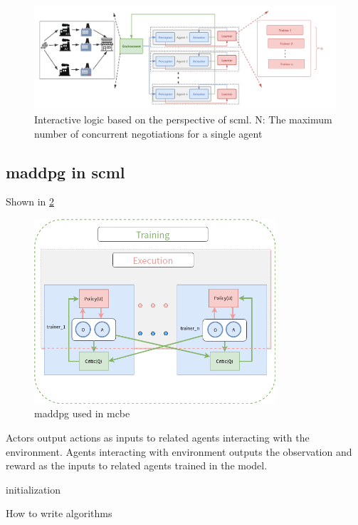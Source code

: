 \begin{figure}[htbp]
\centering
\includegraphics[width=1.0\textwidth]{./images/scnk.png}
\caption{Interactive logic based on the perspective of \gls{scml}. N: The maximum number of concurrent negotiations for a single agent}
\label{fig:interacting-logic-maddpg-scml}
\end{figure}
\subsection{\gls{maddpg} in \gls{scml}} \label{methods:maddpg}
Shown in \ref{fig:method-maddpg-scml}

\begin{figure}[htbp]
\centering
\includegraphics[width=0.80\textwidth]{./images/scml-maddpg.png}
\caption{\gls{maddpg} used in \gls{mcbe}}
\label{fig:method-maddpg-scml}
\end{figure}
Actors output actions as inputs to related agents interacting with the environment. Agents interacting with environment outputs the observation and reward as the inputs to related agents trained in the model. 

\begin{algorithm}[H]
  \SetAlgoLined

  initialization\;
  \caption{How to write algorithms}
\end{algorithm}

